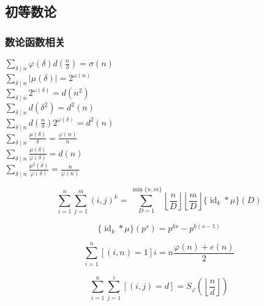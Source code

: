 \subsection{初等数论}

\subsubsection{数论函数相关}

\begin{multicols}{3}
    \(\displaystyle \sum_{\delta\mid n}\varphi(\delta)d\left(\frac{n}{\delta}\right) = \sigma(n)\) \\
    \(\displaystyle \sum_{\delta\mid n}\left|\mu(\delta)\right| = 2^{\omega(n)}\) \\
    \(\displaystyle \sum_{\delta\mid n}2^{\omega(\delta)} = d(n^2)\) \\
    \(\displaystyle \sum_{\delta\mid n}d(\delta^2) = d^2(n)\) \\
    \(\displaystyle \sum_{\delta\mid n}d\left(\frac{n}{\delta}\right)2^{\omega(\delta)} = d^2(n)\) \\
    \(\displaystyle \sum_{\delta\mid n}\frac{\mu(\delta)}{\delta} = \frac{\varphi(n)}{n}\) \\
    \(\displaystyle \sum_{\delta\mid n}\frac{\mu(\delta)}{\varphi(\delta)} = d(n)\) \\
    \(\displaystyle \sum_{\delta\mid n}\frac{\mu^2(\delta)}{\varphi(\delta)} = \frac{n}{\varphi(n)}\)
\end{multicols}

\begin{equation}
    \sum_{i=1}^n\sum_{j=1}^m(i,j)^k=\sum_{D=1}^{\min\{n,m\}}\left\lfloor\frac{n}{D}\right\rfloor\left\lfloor\frac{m}{D}\right\rfloor\{\operatorname{id}_k*\mu\}(D)
\end{equation}

\begin{equation}
    \{\operatorname{id}_k*\mu\}(p^s)=p^{ks}-p^{k(s-1)}
\end{equation}

\begin{equation}
    \sum_{i = 1} ^ n \left[(i, n) = 1\right] i = n \frac {\varphi(n) + e(n)} 2
\end{equation}

\begin{equation}
    \sum_{i = 1} ^ n \sum_{j = 1} ^ i \left[(i, j) = d\right] = S_\varphi \left( \left\lfloor \frac n d \right\rfloor \right)
\end{equation}

